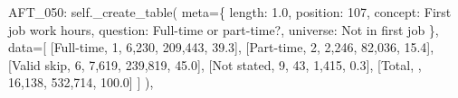 \documentclass[
  11pt,
  a4paper,
]{article}
\newenvironment{Shaded}{\begin{snugshade}}{\end{snugshade}}
\newcommand{\NormalTok}[1]{\textcolor[rgb]{0.00,0.23,0.31}{#1}}
\newcommand{\OperatorTok}[1]{\textcolor[rgb]{0.37,0.37,0.37}{#1}}
\newcommand{\StringTok}[1]{\textcolor[rgb]{0.13,0.47,0.30}{#1}}
\newcommand{\VariableTok}[1]{\textcolor[rgb]{0.07,0.07,0.07}{#1}}
\begin{document}
\begin{Shaded}
\begin{Highlighting}[]
    \StringTok{\textquotesingle{}AFT\_050\textquotesingle{}}\NormalTok{: }\VariableTok{self}\NormalTok{.\_create\_table(}
\NormalTok{        meta}\OperatorTok{=}\NormalTok{\{}
            \StringTok{\textquotesingle{}length\textquotesingle{}}\NormalTok{: }\StringTok{\textquotesingle{}1.0\textquotesingle{}}\NormalTok{, }\StringTok{\textquotesingle{}position\textquotesingle{}}\NormalTok{: }\StringTok{\textquotesingle{}107\textquotesingle{}}\NormalTok{,}
            \StringTok{\textquotesingle{}concept\textquotesingle{}}\NormalTok{: }\StringTok{\textquotesingle{}First job work hours\textquotesingle{}}\NormalTok{,}
            \StringTok{\textquotesingle{}question\textquotesingle{}}\NormalTok{: }\StringTok{\textquotesingle{}Full{-}time or part{-}time?\textquotesingle{}}\NormalTok{,}
            \StringTok{\textquotesingle{}universe\textquotesingle{}}\NormalTok{: }\StringTok{\textquotesingle{}Not in first job\textquotesingle{}}
\NormalTok{        \},}
\NormalTok{        data}\OperatorTok{=}\NormalTok{[}
\NormalTok{            [}\StringTok{\textquotesingle{}Full{-}time\textquotesingle{}}\NormalTok{, }\StringTok{\textquotesingle{}1\textquotesingle{}}\NormalTok{, }\StringTok{\textquotesingle{}6,230\textquotesingle{}}\NormalTok{, }\StringTok{\textquotesingle{}209,443\textquotesingle{}}\NormalTok{, }\StringTok{\textquotesingle{}39.3\textquotesingle{}}\NormalTok{],}
\NormalTok{            [}\StringTok{\textquotesingle{}Part{-}time\textquotesingle{}}\NormalTok{, }\StringTok{\textquotesingle{}2\textquotesingle{}}\NormalTok{, }\StringTok{\textquotesingle{}2,246\textquotesingle{}}\NormalTok{, }\StringTok{\textquotesingle{}82,036\textquotesingle{}}\NormalTok{, }\StringTok{\textquotesingle{}15.4\textquotesingle{}}\NormalTok{],}
\NormalTok{            [}\StringTok{\textquotesingle{}Valid skip\textquotesingle{}}\NormalTok{, }\StringTok{\textquotesingle{}6\textquotesingle{}}\NormalTok{, }\StringTok{\textquotesingle{}7,619\textquotesingle{}}\NormalTok{, }\StringTok{\textquotesingle{}239,819\textquotesingle{}}\NormalTok{, }\StringTok{\textquotesingle{}45.0\textquotesingle{}}\NormalTok{],}
\NormalTok{            [}\StringTok{\textquotesingle{}Not stated\textquotesingle{}}\NormalTok{, }\StringTok{\textquotesingle{}9\textquotesingle{}}\NormalTok{, }\StringTok{\textquotesingle{}43\textquotesingle{}}\NormalTok{, }\StringTok{\textquotesingle{}1,415\textquotesingle{}}\NormalTok{, }\StringTok{\textquotesingle{}0.3\textquotesingle{}}\NormalTok{],}
\NormalTok{            [}\StringTok{\textquotesingle{}Total\textquotesingle{}}\NormalTok{, }\StringTok{\textquotesingle{}\textquotesingle{}}\NormalTok{, }\StringTok{\textquotesingle{}16,138\textquotesingle{}}\NormalTok{, }\StringTok{\textquotesingle{}532,714\textquotesingle{}}\NormalTok{, }\StringTok{\textquotesingle{}100.0\textquotesingle{}}\NormalTok{]}
\NormalTok{        ]}
\NormalTok{    ),}


\end{Highlighting}
\end{Shaded}
\end{document}

